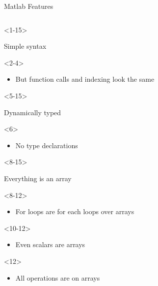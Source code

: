\begin{frame}[fragile]{Matlab Features}
\begin{columns}
    \begin{column}[T]{5cm}
      \begin{itemize}

        \begin{onlyenv}<1-15>
        \item Simple syntax
          \begin{onlyenv}<2-4>
            \begin{itemize}
            \item But function calls and indexing look the same
            \end{itemize}         
          \end{onlyenv}
        \end{onlyenv}
        
        
        \begin{onlyenv}<5-15>
        \item Dynamically typed
          \begin{onlyenv}<6>
            \begin{itemize}
            \item No type declarations
            \end{itemize}         
          \end{onlyenv}
        \end{onlyenv}

        \begin{onlyenv}<8-15>
        \item Everything is an array
          \begin{onlyenv}<8-12>
            \begin{itemize}
            \item For loops are for each loops over arrays
            \end{itemize}    
          \end{onlyenv}
          \begin{onlyenv}<10-12>
            \begin{itemize}
            \item Even scalars are arrays
            \end{itemize}    
          \end{onlyenv}
          \begin{onlyenv}<12>
            \begin{itemize}
            \item All operations are on arrays
            \end{itemize}    
          \end{onlyenv}
        \end{onlyenv}


\end{itemize}
\end{column}
\end{columns}
\end{frame}
